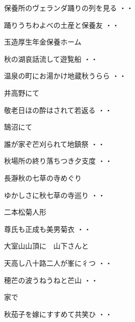 \begin{shiika}保養所のヴェランダ踊りの列を見る
\hfill{・・}\end{shiika}
\begin{shiika}踊りうちわよべの土産と保養友
\hfill{・・}\end{shiika}
\vspace{0.4cm}
玉造厚生年金保養ホーム
\begin{shiika}秋の湖哀話流して遊覧船
\hfill{・・}\end{shiika}
\begin{shiika}温泉の町にお湯かけ地蔵秋うらら
\hfill{・・}\end{shiika}
\vspace{0.4cm}
井高野にて
\begin{shiika}敬老日ほの酔はされて若返る
\hfill{・・}\end{shiika}
\vspace{0.4cm}
鵠沼にて
\begin{shiika}誰が家ぞ芒刈られて地鎮祭
\hfill{・・}\end{shiika}
\begin{shiika}秋場所の終り落ちつき夕支度
\hfill{・・}\end{shiika}
\vspace{0.4cm}
長瀞秋の七草の寺めぐり
\begin{shiika}ゆかしさに秋七草の寺巡り
\hfill{・・}\end{shiika}
\vspace{0.4cm}
二本松菊人形		
\begin{shiika}尊氏も正成も美男菊衣
\hfill{・・}\end{shiika}
\vspace{0.4cm}
大室山山頂に　山下さんと
\begin{shiika}天高し八十路二人が峯に彳つ
\hfill{・・}\end{shiika}
\begin{shiika}穂芒の波うねうねと芒山
\hfill{・・}\end{shiika}
\vspace{0.4cm}
家で
\begin{shiika}秋茄子を嫁にすすめて共笑ひ
\hfill{・・}\end{shiika}
